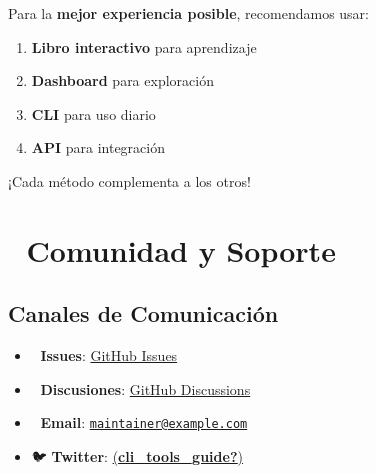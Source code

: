 \documentclass[
  11pt,
  letterpaper,
  oneside,
  openany]{scrbook}
\providecommand{\tightlist}{%
  \setlength{\itemsep}{0pt}\setlength{\parskip}{0pt}}
\begin{document}
\begin{tcolorbox}[enhanced jigsaw, toprule=.15mm, bottomrule=.15mm, opacityback=0, coltitle=black, rightrule=.15mm, colframe=quarto-callout-important-color-frame, titlerule=0mm, opacitybacktitle=0.6, left=2mm, colback=white, bottomtitle=1mm, arc=.35mm, leftrule=.75mm, title=\textcolor{quarto-callout-important-color}{\faExclamation}\hspace{0.5em}{¡Importante!}, colbacktitle=quarto-callout-important-color!10!white, breakable, toptitle=1mm]

Para la \textbf{mejor experiencia posible}, recomendamos usar:

\begin{enumerate}
\def\labelenumi{\arabic{enumi}.}
\tightlist
\item
  \textbf{Libro interactivo} para aprendizaje
\item
  \textbf{Dashboard} para exploración
\item
  \textbf{CLI} para uso diario
\item
  \textbf{API} para integración
\end{enumerate}

¡Cada método complementa a los otros! 🌟

\end{tcolorbox}

\section{🤝 Comunidad y Soporte}\label{comunidad-y-soporte}

\subsection{Canales de Comunicación}\label{canales-de-comunicaciuxf3n}

\begin{itemize}
\tightlist
\item
  🐛 \textbf{Issues}:
  \href{https://github.com/laguileracl/homebrew-cli-guide/issues}{GitHub
  Issues}
\item
  💬 \textbf{Discusiones}:
  \href{https://github.com/laguileracl/homebrew-cli-guide/discussions}{GitHub
  Discussions}
\item
  📧 \textbf{Email}:
  \href{mailto:maintainer@example.com}{\nolinkurl{maintainer@example.com}}
\item
  🐦 \textbf{Twitter}:
  \href{https://twitter.com/cli_tools_guide}{(\textbf{cli\_tools\_guide?})}
\end{itemize}
\end{document}
